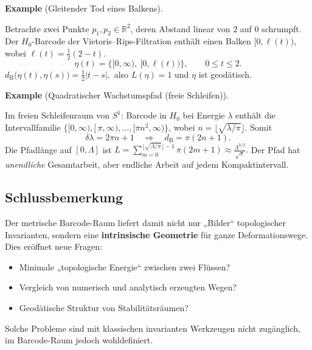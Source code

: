 \documentclass[10pt, letterpaper]{article}
\newcommand{\CustomHeading}[3]{%
  \par\medskip\noindent%
  \textbf{#1 #2} \textnormal{(#3)}.\enskip%
}
\newenvironment{EXA}[2]{\CustomHeading{Example}{#1}{#2}}{}
\begin{document}
\begin{EXA}{}{Gleitender Tod eines Balkens}
  Betrachte zwei Punkte $p_1,p_2\in\mathbb R^2$,
  deren Abstand linear von $2$ auf $0$ schrumpft.
  Der $H_0$-Barcode der Vietoris–Rips-Filtration enthält
  einen Balken $[0,\ell(t))$,
  wobei $\ell(t)=\tfrac12(2-t)$.
  \[
    \eta(t)=
      \bigl\{[0,\infty),\ [0,\ell(t))\bigr\},
      \qquad
      0\le t\le2.
  \]
  \(
    d_{\mathrm B}\bigl(\eta(t),\eta(s)\bigr)
      =\tfrac12|t-s|,
  \)
  also $L(\eta)=1$ und $\eta$ ist geodätisch.
\end{EXA}

\begin{EXA}{}{Quadratischer Wachstums­pfad (freie Schleifen)}
  Im freien Schleifenraum von $S^{1}$:
  Barcode in $H_0$ bei Energie $\lambda$
  enthält die Intervallfamilie
  \(\{[0,\infty),[\,\pi, \infty),\dots,[\pi n^{2},\infty)\}\),
  wobei $n=\lfloor\sqrt{\lambda/\pi}\rfloor$.
  Somit
  \[
    \delta\lambda = 2\pi n+1
    \quad\Longrightarrow\quad
    d_{\mathrm B} = \pi(2n+1).
  \]
  Die Pfadlänge auf $[0,\Lambda]$ ist
  \(
    L=\sum_{m=0}^{\lfloor\sqrt{\Lambda/\pi}\rfloor-1}\pi(2m+1)
    \approx \tfrac{\Lambda^{3/2}}{\sqrt{\pi}}.
  \)
  Der Pfad hat \emph{unendliche} Gesamt­arbeit,
  aber endliche Arbeit auf jedem Kompaktintervall.
\end{EXA}

\subsection{Schlussbemerkung}

Der metrische Barcode-Raum liefert damit nicht nur „Bilder“
topologischer Invarianten, sondern eine
\textbf{intrinsische Geometrie}
für ganze Deformations­wege.
Dies eröffnet neue Fragen:
\begin{itemize}
  \item Minimale „topologische Energie“ zwischen zwei
        Flüssen?
  \item Vergleich von numerisch und analytisch erzeugten Wegen?
  \item Geodätische Struktur von Stabilitätsräumen?
\end{itemize}
Solche Probleme sind mit klassischen invarianten Werkzeugen
nicht zugänglich, im Barcode-Raum jedoch wohldefiniert.







\end{document}

